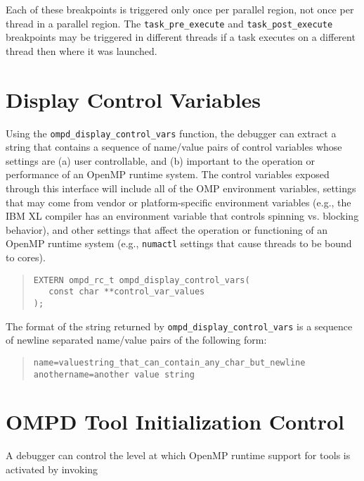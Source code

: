 \documentclass{article}
\begin{document}
Each of these breakpoints is triggered only once per parallel region, not once per thread in a parallel region. The  \verb|task_pre_execute| and  \verb|task_post_execute| breakpoints may be triggered in different threads if a task executes on a different thread then where it was launched.



\section{Display Control Variables}
Using the \verb|ompd_display_control_vars| function, the debugger can extract a string that contains a sequence of name/value pairs of control variables whose settings are (a) user controllable, and (b) important to the operation or performance of an OpenMP runtime system. The control variables exposed through this interface will include all of the OMP environment variables,  settings that may come from vendor or platform-specific environment variables (e.g., the IBM XL compiler has an environment variable that controls spinning vs. blocking behavior), and other settings that affect the operation or functioning of an OpenMP runtime system  (e.g., {\tt numactl} settings that cause threads to be bound to cores).

\begin{quote}
\begin{verbatim}
EXTERN ompd_rc_t ompd_display_control_vars(
   const char **control_var_values
);
\end{verbatim}
\end{quote}

The format of the string returned by \verb|ompd_display_control_vars| is a sequence of newline separated name/value pairs of the following form:

\begin{quote}
\begin{verbatim}
name=valuestring_that_can_contain_any_char_but_newline
anothername=another value string
\end{verbatim}
\end{quote}




\section{OMPD Tool Initialization Control}
\label{sec:debug-init}

A debugger can control the level at which OpenMP runtime support for tools is activated by invoking
\end{document}
